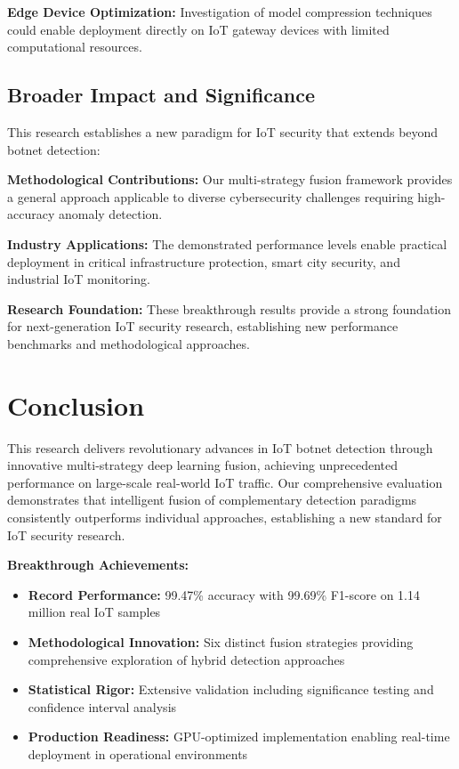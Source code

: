 \documentclass[conference]{IEEEtran}
\begin{document}
\textbf{Edge Device Optimization:} Investigation of model compression techniques could enable deployment directly on IoT gateway devices with limited computational resources.

\subsection{Broader Impact and Significance}

This research establishes a new paradigm for IoT security that extends beyond botnet detection:

\textbf{Methodological Contributions:} Our multi-strategy fusion framework provides a general approach applicable to diverse cybersecurity challenges requiring high-accuracy anomaly detection.

\textbf{Industry Applications:} The demonstrated performance levels enable practical deployment in critical infrastructure protection, smart city security, and industrial IoT monitoring.

\textbf{Research Foundation:} These breakthrough results provide a strong foundation for next-generation IoT security research, establishing new performance benchmarks and methodological approaches.

\section{Conclusion}

This research delivers revolutionary advances in IoT botnet detection through innovative multi-strategy deep learning fusion, achieving unprecedented performance on large-scale real-world IoT traffic. Our comprehensive evaluation demonstrates that intelligent fusion of complementary detection paradigms consistently outperforms individual approaches, establishing a new standard for IoT security research.

\textbf{Breakthrough Achievements:}
\begin{itemize}
\item \textbf{Record Performance:} 99.47\% accuracy with 99.69\% F1-score on 1.14 million real IoT samples
\item \textbf{Methodological Innovation:} Six distinct fusion strategies providing comprehensive exploration of hybrid detection approaches
\item \textbf{Statistical Rigor:} Extensive validation including significance testing and confidence interval analysis
\item \textbf{Production Readiness:} GPU-optimized implementation enabling real-time deployment in operational environments
\end{itemize}
\end{document}
